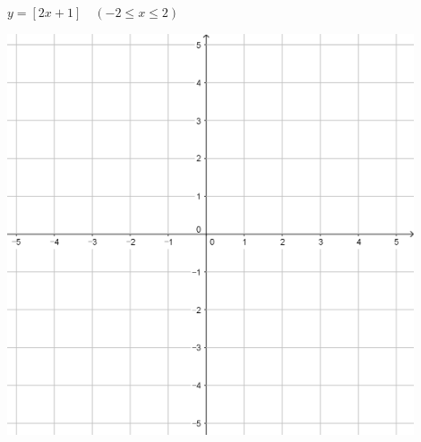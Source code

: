 \documentclass[a4paper]{oblivoir}
\begin{document}
\begin{minipage}{0.45\textwidth}\centering
\(y=[2x+1]\quad(-2\le x\le2)\)
\par\bigskip\includegraphics[width=0.9\textwidth]{55}
\end{minipage}\bigskip\bigskip\par
\end{document}

